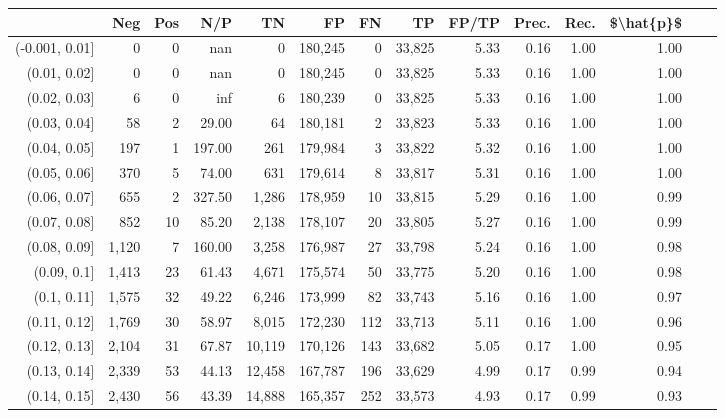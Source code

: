 \begin{tabular}{rrrrrrrrrrrrrr}
\toprule
{} &    Neg &  Pos &     N/P &       TN &       FP &      FN &      TP & FP/TP & Prec. &  Rec. & \$\textbackslash hat\{p\}\$ \\
\midrule
(-0.001, 0.01] &      0 &    0 &     nan &        0 &  180,245 &       0 &  33,825 &  5.33 &  0.16 &  1.00 &      1.00 \\
(0.01, 0.02]   &      0 &    0 &     nan &        0 &  180,245 &       0 &  33,825 &  5.33 &  0.16 &  1.00 &      1.00 \\
(0.02, 0.03]   &      6 &    0 &     inf &        6 &  180,239 &       0 &  33,825 &  5.33 &  0.16 &  1.00 &      1.00 \\
(0.03, 0.04]   &     58 &    2 &   29.00 &       64 &  180,181 &       2 &  33,823 &  5.33 &  0.16 &  1.00 &      1.00 \\
(0.04, 0.05]   &    197 &    1 &  197.00 &      261 &  179,984 &       3 &  33,822 &  5.32 &  0.16 &  1.00 &      1.00 \\
(0.05, 0.06]   &    370 &    5 &   74.00 &      631 &  179,614 &       8 &  33,817 &  5.31 &  0.16 &  1.00 &      1.00 \\
(0.06, 0.07]   &    655 &    2 &  327.50 &    1,286 &  178,959 &      10 &  33,815 &  5.29 &  0.16 &  1.00 &      0.99 \\
(0.07, 0.08]   &    852 &   10 &   85.20 &    2,138 &  178,107 &      20 &  33,805 &  5.27 &  0.16 &  1.00 &      0.99 \\
(0.08, 0.09]   &  1,120 &    7 &  160.00 &    3,258 &  176,987 &      27 &  33,798 &  5.24 &  0.16 &  1.00 &      0.98 \\
(0.09, 0.1]    &  1,413 &   23 &   61.43 &    4,671 &  175,574 &      50 &  33,775 &  5.20 &  0.16 &  1.00 &      0.98 \\
(0.1, 0.11]    &  1,575 &   32 &   49.22 &    6,246 &  173,999 &      82 &  33,743 &  5.16 &  0.16 &  1.00 &      0.97 \\
(0.11, 0.12]   &  1,769 &   30 &   58.97 &    8,015 &  172,230 &     112 &  33,713 &  5.11 &  0.16 &  1.00 &      0.96 \\
(0.12, 0.13]   &  2,104 &   31 &   67.87 &   10,119 &  170,126 &     143 &  33,682 &  5.05 &  0.17 &  1.00 &      0.95 \\
(0.13, 0.14]   &  2,339 &   53 &   44.13 &   12,458 &  167,787 &     196 &  33,629 &  4.99 &  0.17 &  0.99 &      0.94 \\
(0.14, 0.15]   &  2,430 &   56 &   43.39 &   14,888 &  165,357 &     252 &  33,573 &  4.93 &  0.17 &  0.99 &      0.93 \\

\end{tabular}
